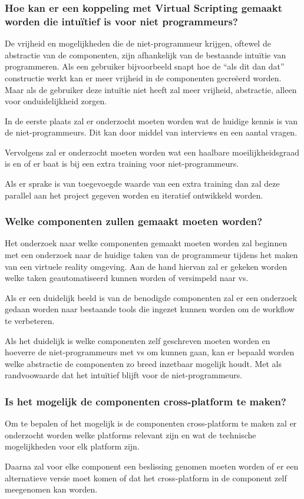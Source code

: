 \subsubsection{Hoe kan er een koppeling met Virtual Scripting gemaakt worden die intuïtief is voor niet programmeurs?}

De vrijheid en mogelijkheden die de niet-programmeur krijgen, oftewel de abstractie van de componenten, zijn afhankelijk van de bestaande intuïtie van programmeren. Als een gebruiker bijvoorbeeld snapt hoe de “als dit dan dat” constructie werkt kan er meer vrijheid in de componenten gecreëerd worden. Maar als de gebruiker deze intuïtie niet heeft zal meer vrijheid, abstractie, alleen voor onduidelijkheid zorgen.

In de eerste plaats zal er onderzocht moeten worden wat de huidige kennis is van de niet-programmeurs. Dit kan door middel van interviews en een aantal vragen.

Vervolgens zal er onderzocht moeten worden wat een haalbare moeilijkheidsgraad is en of er baat is bij een extra training voor niet-programmeurs.

Als er sprake is van toegevoegde waarde van een extra training dan zal deze parallel aan het project gegeven worden en iteratief ontwikkeld worden.

\subsubsection{Welke componenten zullen gemaakt moeten worden?}
Het onderzoek naar welke componenten gemaakt moeten worden zal beginnen met een onderzoek naar de huidige taken van de programmeur tijdens het maken van een virtuele reality omgeving. Aan de hand hiervan zal er gekeken worden welke taken geautomatiseerd kunnen worden of versimpeld naar \gls{vs}.

Als er een duidelijk beeld is van de benodigde componenten zal er een onderzoek gedaan worden naar bestaande tools die ingezet kunnen worden om de workflow te verbeteren.

Als het duidelijk is welke componenten zelf geschreven moeten worden en hoeverre de niet-programmeurs met \gls{vs} om kunnen gaan, kan er bepaald worden welke abstractie de componenten zo breed inzetbaar mogelijk houdt. Met als randvoowaarde dat het intuïtief blijft voor de niet-programmeurs.

\subsubsection{Is het mogelijk de componenten cross-platform te maken?}
Om te bepalen of het mogelijk is de componenten cross-platform te maken zal er onderzocht worden welke platforms relevant zijn en wat de technische mogelijkheden voor elk platform zijn.

Daarna zal voor elke component een beslissing genomen moeten worden of er een alternatieve versie moet komen of dat het cross-platform in de component zelf meegenomen kan worden.
